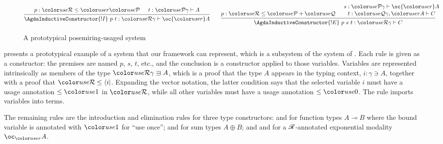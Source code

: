 \begin{figure}
\begin{displaymath}
  \end{displaymath}
  \begin{displaymath}
    \begin{prooftree}
      \hypo{p : \grR \leq \gr r\grP}
      \hypo{t : \grP\gamma \vdash A}
      \infer2{\AgdaInductiveConstructor{!I}~p~t : \grR\gamma \vdash \oc{\gr r} A}
    \end{prooftree}
    \qquad
    \begin{prooftree}
      \hypo{p : \grR \leq \grP + \grQ}
      \hypo{s : \grP\gamma \vdash \oc{\gr r} A}
      \infer[no rule]1{t : \grQ\gamma, \gr rA \vdash C}
      \infer2{\AgdaInductiveConstructor{!E}~p~s~t : \grR\gamma \vdash C}
    \end{prooftree}
  \end{displaymath}
  \caption{A prototypical posemiring-usaged system}\label{fig:lr}
\end{figure}

 presents a prototypical example of a system that our
framework can represent, which is a subsystem of the \name{} system of
\cite{WA20}. Each rule is given as a constructor: the premises are
named $p$, $s$, $t$, etc., and the conclusion is a constructor applied
to those variables. Variables are represented intrinsically as members
of the type $\grR\gamma \sqni A$, which is a proof that the type $A$
appears in the typing context, $i : \gamma \ni A$, together with a
proof that $\grR \leq \langle i \rvert$.  Expanding the vector
notation, the latter condition says that the selected variable $i$
must have a usage annotation $\leq \gr1$ in $\grR$, while all other
variables must have a usage annotation $\leq \gr0$. The
 rule imports variables into terms.

The remaining rules are the introduction and elimination rules for
three type constructors:  and
 for function types $A \multimap B$ where
the bound variable is annotated with $\gr 1$ for ``use once'';
 and  for
sum types $A \oplus B$; and  and
 for a $\mathscr R$-annotated exponential
modality $\oc_{\gr r} A$.

